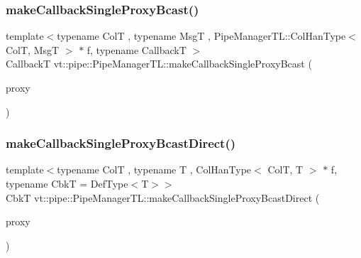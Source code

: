\mbox{\label{structvt_1_1pipe_1_1_pipe_manager_t_l_aff5140772699150c68dc912017e3a670}} 
\subsubsection{\texorpdfstring{make\+Callback\+Single\+Proxy\+Bcast()}{makeCallbackSingleProxyBcast()}\hspace{0.1cm}{\footnotesize\ttfamily [2/2]}}
{\footnotesize\ttfamily template$<$typename ColT , typename MsgT , Pipe\+Manager\+T\+L\+::\+Col\+Han\+Type$<$ Col\+T, Msg\+T $>$ $\ast$ f, typename CallbackT $>$ \\
CallbackT vt\+::pipe\+::\+Pipe\+Manager\+T\+L\+::make\+Callback\+Single\+Proxy\+Bcast (\begin{DoxyParamCaption}\item[{\hyperlink{structvt_1_1pipe_1_1_pipe_manager_t_l_af56c58cad882496e35f01227d4da3898}{Col\+Proxy\+Type}$<$ ColT $>$}]{proxy }\end{DoxyParamCaption})}

\mbox{\label{structvt_1_1pipe_1_1_pipe_manager_t_l_aff70024da9ee15ef2c935ca21d18a80d}} 
\subsubsection{\texorpdfstring{make\+Callback\+Single\+Proxy\+Bcast\+Direct()}{makeCallbackSingleProxyBcastDirect()}\hspace{0.1cm}{\footnotesize\ttfamily [1/3]}}
{\footnotesize\ttfamily template$<$typename ColT , typename T , Col\+Han\+Type$<$ Col\+T, T $>$ $\ast$ f, typename CbkT  = Def\+Type$<$\+T$>$$>$ \\
CbkT vt\+::pipe\+::\+Pipe\+Manager\+T\+L\+::make\+Callback\+Single\+Proxy\+Bcast\+Direct (\begin{DoxyParamCaption}\item[{\hyperlink{structvt_1_1pipe_1_1_pipe_manager_t_l_af56c58cad882496e35f01227d4da3898}{Col\+Proxy\+Type}$<$ ColT $>$}]{proxy }\end{DoxyParamCaption})}

